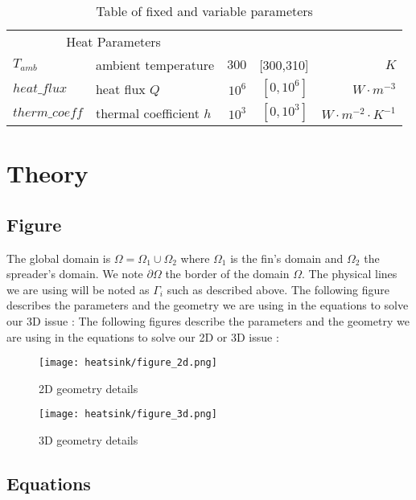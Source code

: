 \begin{table}[htbp]
\begin{tabular}{@{}llrrr@{}}
\multicolumn{2}{c}{Heat Parameters} \\ \cmidrule(r){1-2}
$T_{amb}$ & ambient temperature & $300$ & [300,310] & $K$ \\
$heat\_flux$ & heat flux $Q$ & $10^6$ & $[0 ,10^{6}]$ & $W \cdot m^{-3}$\\
$therm\_coeff$ & thermal coefficient $h$ & $10^3$ & $[0,10^3]$ & $W\cdot m^{-2} \cdot K^{-1}$ \\
\end{tabular}

  \caption{Table of fixed and variable parameters}
  \label{tab:param}
\end{table}


\section{Theory}
\label{therm:equations}

\subsection{Figure}
The global domain is $\varOmega = \varOmega_1 \cup \varOmega_2 $ where $\varOmega_1$ is the fin's domain and $\varOmega_2$ the spreader's domain. We note $\partial\varOmega$ the border of the domain $\varOmega$. The physical lines we are using will be noted as $\Gamma_i$ such as described above. The following figure describes the parameters and the geometry we are using in the equations to solve our 3D issue :
The following figures describe the parameters and the geometry we are using in the equations to solve our 2D or 3D issue :
\begin{figure}[!h]
\centering
\texttt{[image: heatsink/figure\_2d.png]}
\caption{2D geometry details}
\end{figure}

\begin{figure}[!h]
\centering
\texttt{[image: heatsink/figure\_3d.png]}
\caption{3D geometry details}
\end{figure}
\clearpage

\subsection{Equations}

